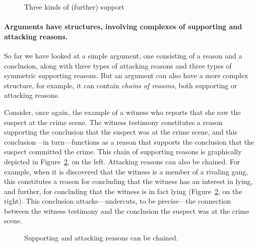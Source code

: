 \documentclass[10pt]{article}
\begin{document}
\begin{figure}[bt]
\centering

\caption{Three kinds of (further) support\label{fig:support}}
\end{figure}


\paragraph{Arguments have structures, involving complexes of supporting and attacking reasons.} 

So far we have looked at a simple argument, one consisting of a reason and a conclusion, along with three types 
of attacking reasons and three types of symmetric supporting reasons. But an argument can also have 
a more complex structure, for example, it can contain \textit{chains of reasons}, both supporting or attacking reasons. 

Consider, once again, the example of a witness who reports that she saw the suspect at the crime scene. The witness testimony constitutes a 
reason supporting the conclusion that the suspect was at the crime scene, and this conclusion---in turn---functions as a reason 
that supports the conclusion that the suspect committed the crime. This chain of supporting reasons 
is graphically depicted in Figure~\ref{fig:arg2}, on the left. 
Attacking reasons can also be chained. For example, when it is discovered that the witness is a member of a rivaling gang, 
this constitutes a reason for concluding that the witness has an interest in lying, and further, for concluding 
that the witness is in fact lying (Figure~\ref{fig:arg2}, on the right). This conclusion attacks---undercuts, to be precise---the connection 
between the witness testimony and the conclusion the suspect was at the crime scene.

\begin{figure}[bt]
\centering

\caption{Supporting and attacking reasons can be chained. \label{fig:arg2}}
\end{figure}
\end{document}
